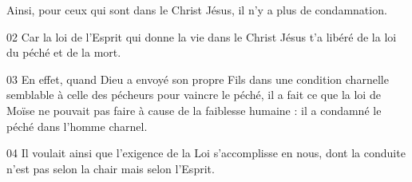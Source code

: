 Ainsi, pour ceux qui sont dans le Christ Jésus, il n’y a plus de condamnation.

02 Car la loi de l’Esprit qui donne la vie dans le Christ Jésus t’a libéré de la loi du péché et de la mort.

03 En effet, quand Dieu a envoyé son propre Fils dans une condition charnelle semblable à celle des pécheurs pour vaincre le péché, il a fait ce que la loi de Moïse ne pouvait pas faire à cause de la faiblesse humaine : il a condamné le péché dans l’homme charnel.

04 Il voulait ainsi que l’exigence de la Loi s’accomplisse en nous, dont la conduite n’est pas selon la chair mais selon l’Esprit.
